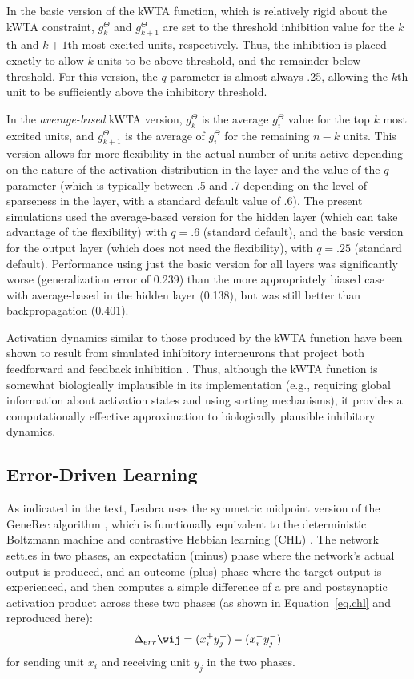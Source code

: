\documentclass[12pt,twoside]{article}
\begin{document}
In the basic version of the kWTA function, which is relatively rigid
about the kWTA constraint, $g^{\Theta}_k$ and $g^{\Theta}_{k+1}$ are
set to the threshold inhibition value for the $k$th and $k+1$th
most excited units, respectively.  Thus, the inhibition is placed
exactly to allow $k$ units to be above threshold, and the remainder
below threshold.  For this version, the $q$ parameter is almost always
.25, allowing the $k$th unit to be sufficiently above the inhibitory
threshold.

In the {\em average-based} kWTA version, $g^{\Theta}_k$ is the average
$g_i^{\Theta}$ value for the top $k$ most excited units, and
$g^{\Theta}_{k+1}$ is the average of $g_i^{\Theta}$ for the remaining
$n-k$ units.  This version allows for more flexibility in the actual
number of units active depending on the nature of the activation
distribution in the layer and the value of the $q$ parameter (which is
typically between .5 and .7 depending on the level of sparseness in
the layer, with a standard default value of .6).  The present
simulations used the average-based version for the hidden layer (which
can take advantage of the flexibility) with $q=.6$ (standard default),
and the basic version for the output layer (which does not need the
flexibility), with $q=.25$ (standard default).  Performance using just
the basic version for all layers was significantly worse
(generalization error of 0.239) than the more appropriately biased
case with average-based in the hidden layer (0.138), but was still
better than backpropagation (0.401).

Activation dynamics similar to those produced by the kWTA function
have been shown to result from simulated inhibitory interneurons that
project both feedforward and feedback inhibition
\cite{OReillyMunakata00}.  Thus, although the kWTA function is
somewhat biologically implausible in its implementation (e.g., requiring
global information about activation states and using sorting
mechanisms), it provides a computationally effective approximation to
biologically plausible inhibitory dynamics.

\subsection{Error-Driven Learning} 

As indicated in the text, Leabra uses the symmetric midpoint version
of the GeneRec algorithm \cite{OReilly96}, which is functionally
equivalent to the deterministic Boltzmann machine and contrastive
Hebbian learning (CHL) \cite{Hinton89,Movellan90}.  The network
settles in two phases, an expectation (minus) phase where the
network's actual output is produced, and an outcome (plus) phase where
the target output is experienced, and then computes a simple
difference of a pre and postsynaptic activation product across these
two phases (as shown in Equation~\ref{eq.chl} and reproduced here):
\begin{equation}
  \Delta_{err} \wij = (x^+_i y^+_j) - (x^-_i y^-_j)
  \label{eq.err}
\end{equation}
for sending unit $x_i$ and receiving unit $y_j$ in the two phases.
\end{document}
